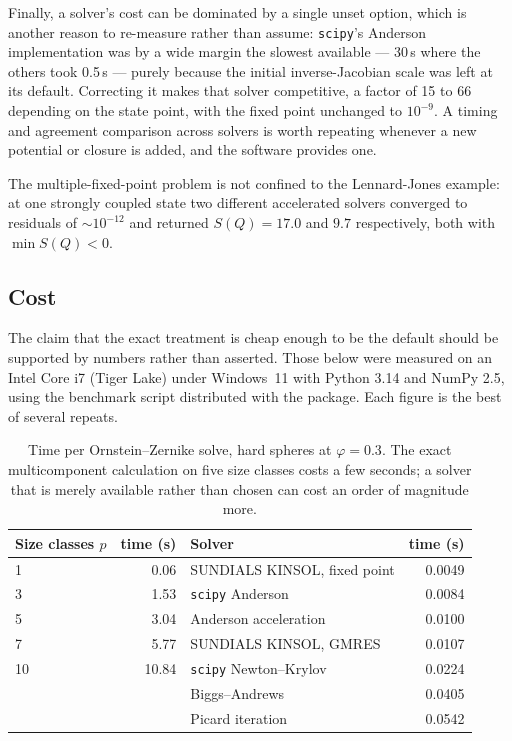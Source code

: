 \documentclass[11pt,a4paper]{article}
\newcommand{\code}[1]{\texttt{#1}}
\newcommand{\Q}{Q}
\begin{document}
Finally, a solver's cost can be dominated by a single unset option, which is
another reason to re-measure rather than assume: \code{scipy}'s Anderson
implementation was by a wide margin the slowest available --- 30\,s where the
others took 0.5\,s --- purely because the initial inverse-Jacobian scale was
left at its default. Correcting it makes that solver competitive, a factor of
15 to 66 depending on the state point, with the fixed point unchanged to
$10^{-9}$. A timing and agreement comparison across solvers is worth
repeating whenever a new potential or closure is added, and the software
provides one.

The multiple-fixed-point problem is not confined to the Lennard-Jones
example: at one strongly coupled state two different accelerated solvers
converged to residuals of $\sim10^{-12}$ and returned $S(\Q) = 17.0$ and
$9.7$ respectively, both with $\min S(\Q) < 0$.

\subsection{Cost}
\label{sec:timing}

The claim that the exact treatment is cheap enough to be the default should be
supported by numbers rather than asserted. Those below were measured on an
Intel Core i7 (Tiger Lake) under Windows~11 with Python 3.14 and NumPy 2.5,
using the benchmark script distributed with the package. Each figure is the
best of several repeats.

\begin{table}[htbp]
\centering
\caption{Time per Ornstein--Zernike solve, hard spheres at $\varphi = 0.3$.
The exact multicomponent calculation on five size classes costs a few
seconds; a solver that is merely available rather than chosen can cost an
order of magnitude more.}
\label{tab:timing}
\small
\begin{tabular}{lr@{\qquad}lr}
\toprule
Size classes $p$ & time (s) & Solver & time (s)\\
\midrule
1  & 0.06  & SUNDIALS KINSOL, fixed point & 0.0049\\
3  & 1.53  & \code{scipy} Anderson         & 0.0084\\
5  & 3.04  & Anderson acceleration         & 0.0100\\
7  & 5.77  & SUNDIALS KINSOL, GMRES        & 0.0107\\
10 & 10.84 & \code{scipy} Newton--Krylov   & 0.0224\\
   &       & Biggs--Andrews                & 0.0405\\
   &       & Picard iteration              & 0.0542\\
\bottomrule
\end{tabular}
\end{table}
\end{document}
